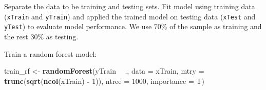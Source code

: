 \documentclass[12pt,]{krantz}
\makeatletter
\newenvironment{Shaded}{\begin{snugshade}}{\end{snugshade}}
\newcommand{\CommentTok}[1]{\textcolor[rgb]{0.37,0.37,0.37}{\textit{#1}}}
\newcommand{\DataTypeTok}[1]{\textcolor[rgb]{0.27,0.27,0.27}{#1}}
\newcommand{\DecValTok}[1]{\textcolor[rgb]{0.06,0.06,0.06}{#1}}
\newcommand{\FloatTok}[1]{\textcolor[rgb]{0.06,0.06,0.06}{#1}}
\newcommand{\KeywordTok}[1]{\textcolor[rgb]{0.27,0.27,0.27}{\textbf{#1}}}
\newcommand{\NormalTok}[1]{#1}
\newcommand{\OperatorTok}[1]{\textcolor[rgb]{0.43,0.43,0.43}{\textbf{#1}}}
\newcommand{\StringTok}[1]{\textcolor[rgb]{0.5,0.5,0.5}{#1}}
\newenvironment{kframe}{%
\medskip{}
\setlength{\fboxsep}{.8em}
 \def\at@end@of@kframe{}%
 \ifinner\ifhmode%
  \def\at@end@of@kframe{\end{minipage}}%
  \begin{minipage}{\columnwidth}%
 \fi\fi%
 \def\FrameCommand##1{\hskip\@totalleftmargin \hskip-\fboxsep
 \colorbox{shadecolor}{##1}\hskip-\fboxsep
     \hskip-\linewidth \hskip-\@totalleftmargin \hskip\columnwidth}%
 \MakeFramed {\advance\hsize-\width
   \@totalleftmargin\z@ \linewidth\hsize
   \@setminipage}}%
 {\par\unskip\endMakeFramed%
 \at@end@of@kframe}
\renewenvironment{Shaded}{\begin{kframe}}{\end{kframe}}
\makeatother
\begin{document}
Separate the data to be training and testing sets. Fit model using training data (\texttt{xTrain} and \texttt{yTrain}) and applied the trained model on testing data (\texttt{xTest} and \texttt{yTest}) to evaluate model performance. We use 70\% of the sample as training and the rest 30\% as testing.

\begin{Shaded}
\end{Shaded}

Train a random forest model:

\begin{Shaded}
\begin{Highlighting}[]
\NormalTok{train_rf <-}\StringTok{ }\KeywordTok{randomForest}\NormalTok{(yTrain }\OperatorTok{~}\StringTok{ }\NormalTok{., }
                         \DataTypeTok{data =}\NormalTok{ xTrain, }
                         \DataTypeTok{mtry =} \KeywordTok{trunc}\NormalTok{(}\KeywordTok{sqrt}\NormalTok{(}\KeywordTok{ncol}\NormalTok{(xTrain) }\OperatorTok{-}\StringTok{ }\DecValTok{1}\NormalTok{)),}
                         \DataTypeTok{ntree =} \DecValTok{1000}\NormalTok{, }
                         \DataTypeTok{importance =}\NormalTok{ T)}
\end{Highlighting}
\end{Shaded}
\end{document}

